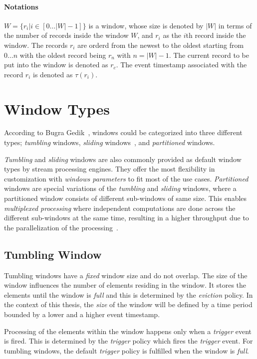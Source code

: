 \paragraph{Notations}%
$W = \{r_i | i \in [0\dots|W| - 1] \} $ is a window, whose size is denoted by $|W|$ in terms 
of the number of records inside the window $W$, and $r_i$ as the $i$th record inside 
the window. The records $r_i$ are orderd from the newest to the oldest starting from 
$0\dots n$ with the oldest record being $r_n$ with $ n = |W| - 1$. The current record to be put 
into the window is denoted as $r_c$. The event timestamp associated with the
record $r_i$ is denoted as $\tau(r_i)$.

\section{Window Types}

According to Bugra Gedik~\cite{generic_window_sem}, windows could be categorized into 
three different types; \emph{tumbling} windows, 
\emph{sliding} windows~\cite{stream_standford,spade_stream}, and \emph{partitioned} windows.

\emph{Tumbling} and \emph{sliding} windows are also commonly provided as 
 default window types by stream processing engines. 
They offer the most flexibility in customization with \emph{windows parameters} to fit 
most of the use cases.
\emph{Partitioned} windows are special variations of the \emph{tumbling} and
\emph{sliding} windows, where a partitioned window consists of different sub-windows of same size. 
This enables \emph{multiplexed processing} where independent computations are done across the 
different sub-windows at the same time, resulting in a higher throughput due to 
the parallelization of the processing~\cite{generic_window_sem}.

\subsection{Tumbling Window}%
\label{sec:Tumbling Window}
Tumbling windows have a \emph{fixed} window size and do not 
overlap. The size of the window influences 
the number of elements residing in the window. It stores the elements 
until the window is \emph{full} and this is determined by the \emph{eviction} policy. 
In the context of this thesis, the \emph{size} of the window will be defined by 
a time period bounded by a lower and a higher event timestamp. 

Processing of the elements within the window happens only when a \emph{trigger}
event is fired. This is determined by the \emph{trigger} policy which fires the 
\emph{trigger} event. For tumbling windows, the default \emph{trigger} policy is 
fulfilled when the window is \emph{full}.


